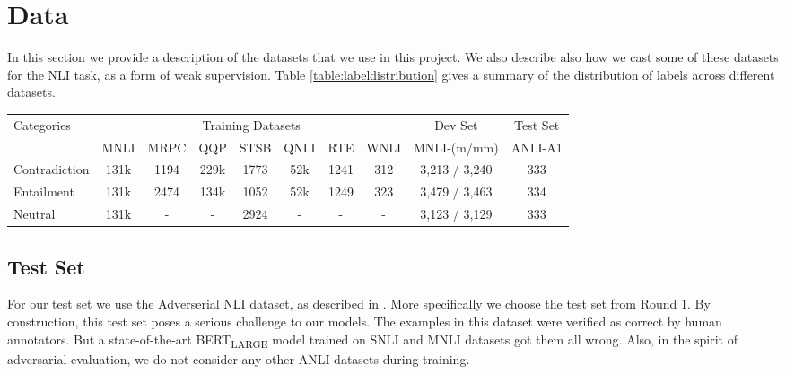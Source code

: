 \section{Data}
\label{sec:data}


In this section we provide a description of the datasets that we use in this project. We also describe also how we cast some of these datasets for the NLI task, as a form of weak supervision. Table \ref{table:labeldistribution} gives a summary of the distribution of labels across different datasets.

\begin{table*}
\small
\centering
\begin{tabular}{l ccccccc | c c}

\toprule
Categories
                                        & \multicolumn{7}{c|}{Training Datasets} 
                                        & \multicolumn{1}{c}{Dev Set}   
                                        & \multicolumn{1}{c}{Test Set} \\ 
                                        
																				& MNLI      & MRPC  	& QQP				&STSB				&QNLI    		& RTE				& WNLI   	& MNLI-(m/mm)   	& ANLI-A1  \\
\midrule

Contradiction														& 131k			& 1194 		& 229k 			& 1773			& 52k 			& 1241			& 312			& 3,213 / 3,240   & 333 \\
Entailment   								 		    		& 131k  		& 2474 		& 134k 			& 1052			& 52k				& 1249			& 323			& 3,479 / 3,463   & 334 \\
Neutral    															& 131k  		& - 			& - 				& 2924			& -					& -					& -				& 3,123 / 3,129   & 333 \\

\bottomrule
\end{tabular}

\caption{\label{table:labeldistribution} Distribution of labels across different datasets}
\end{table*}

\subsection{Test Set}
\label{subsec:testset}

For our test set we use the Adverserial NLI dataset, as described in \cite{nie2019adversarial}. More specifically we choose the test set from Round 1. By construction, this test set poses a serious challenge to our models. The examples in this dataset were verified as correct by human annotators. But a state-of-the-art BERT\textsubscript{LARGE} model trained on SNLI \cite{bowman2015large} and MNLI \cite{williams2017broad} datasets got them all wrong. Also, in the spirit of adversarial evaluation, we do not consider any other ANLI datasets during training. 

